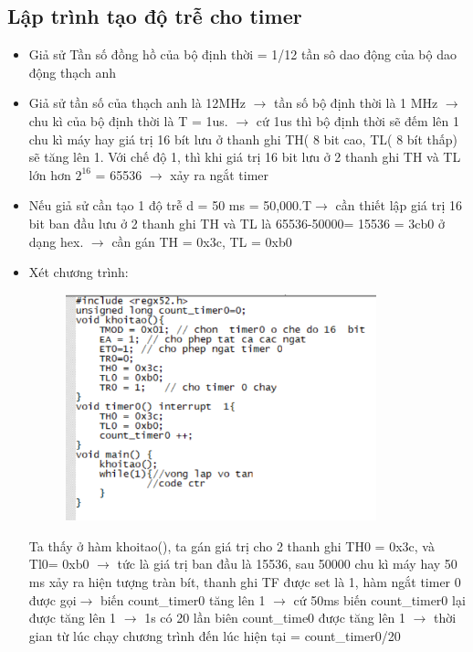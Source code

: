 \documentclass[../report.tex]{subfiles}
\begin{document}
\subsection{Lập trình tạo độ trễ cho timer}
\begin{itemize}
    \item Giả sử Tần số đồng hồ của bộ định thời = 1/12 tần sô dao động của bộ dao động  thạch anh
    \item Giả sử tần số của thạch anh là 12MHz $\rightarrow$ tần số bộ định thời là 1 MHz $\rightarrow$ chu kì của bộ định thời là T = 1us. $\rightarrow$ cứ 1us thì bộ định thời sẽ đếm lên 1 chu kì máy hay giá trị 16 bít lưu ở thanh ghi TH( 8 bit cao, TL( 8 bít thấp) sẽ tăng lên 1. Với chế độ 1, thì khi giá trị 16 bit lưu ở 2 thanh ghi TH và TL lớn hơn $2^16$ = 65536 $\rightarrow$ xảy ra ngắt timer
    \item Nếu giả sử cần tạo 1 độ trễ d  = 50 ms = 50,000.T$\rightarrow$ cần thiết lập giá trị 16 bit ban đầu lưu ở 2 thanh ghi TH và TL là 65536-50000= 15536 = 3cb0 ở dạng hex. $\rightarrow$ cần gán TH = 0x3c, TL = 0xb0
    \item Xét chương trình:
        \begin{figure}[H]
            \centering
            \includegraphics[width=9cm]{figures/code.png}
        \end{figure} 
    
        Ta thấy ở hàm khoitao(), ta gán giá trị cho 2 thanh ghi TH0 = 0x3c, và Tl0= 0xb0 $\rightarrow$ tức là giá trị ban đầu là 15536, sau 50000 chu kì máy hay 50 ms xảy ra hiện tượng tràn bít, thanh ghi TF được set là 1, hàm ngắt timer 0 được gọi$\rightarrow$ biến count\_timer0 tăng lên 1
$\rightarrow$ cứ 50ms biến count\_timer0 lại được tăng lên 1
$\rightarrow$ 1s có 20 lần biên count\_time0 được tăng lên 1
$\rightarrow$ thời gian từ lúc chạy chương trình đến lúc hiện tại = count\_timer0/20

\end{itemize}
\end{document}
